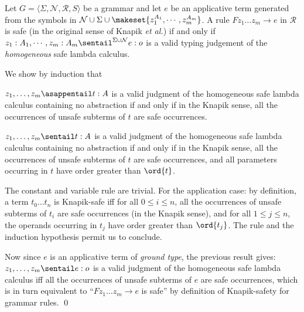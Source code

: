\begin{proposition}
\label{prop:safegram_safelmd}
 Let $G = \langle \Sigma, \mathcal{N}, \mathcal{R},
  S \rangle$ be a grammar and let $e$ be an applicative term generated
  from the symbols in $\mathcal{N} \cup \Sigma \cup \makeset{z_1^{A_1},
    \cdots, z_m^{A_m}}$.  A rule $F z_1 \ldots z_m \rightarrow e$ in
  $\mathcal{R}$ is safe (in the original sense of Knapik \emph{et al.}) if and only if $ z_1 : A_1, \cdots, z_m : A_m
  \sentail^{\Sigma \cup \mathcal{N}} e : o$ is a valid typing judgement
  of the \emph{homogeneous} safe lambda calculus.
\end{proposition}
\proof
We show by induction that \begin{asparaenum}
\item  $z_1,\ldots, z_m \asappentail t:A$ is a valid judgment of the homogeneous safe lambda calculus containing no abstraction if and only if in the Knapik sense, all the occurrences of unsafe subterms of $t$ are safe occurrences.
\item $z_1,\ldots, z_m \sentail t:A$ is a valid judgment of the homogeneous safe lambda calculus containing no abstraction if and only if in the Knapik sense, all the occurrences of unsafe subterms of $t$ are safe occurrences, and all parameters occurring in $t$ have order greater than $\ord{t}$. \end{asparaenum}
The constant and variable rule are trivial. For the application case: by definition, a term $t_0 \ldots t_n$ is Knapik-safe iff for all $0\leq i \leq n$, all the occurrences of unsafe subterms of $t_i$ are safe occurrences (in the Knapik sense), and for all $1\leq j \leq n$, the operands occurring in $t_j$ have order greater than $\ord{t_j}$. The  rule and the induction hypothesis permit us to conclude.

Now since $e$ is an applicative term of \emph{ground type}, the previous result gives:
$z_1,\ldots, z_m \sentail e:o$ is a valid judgment of the homogeneous safe lambda calculus iff
all the occurrences of unsafe subterms of $e$ are safe occurrences, which is in turn equivalent to ``$F z_1 \ldots z_m \rightarrow e$ is safe'' by definition of Knapik-safety for grammar rules. \qed
\bigskip

